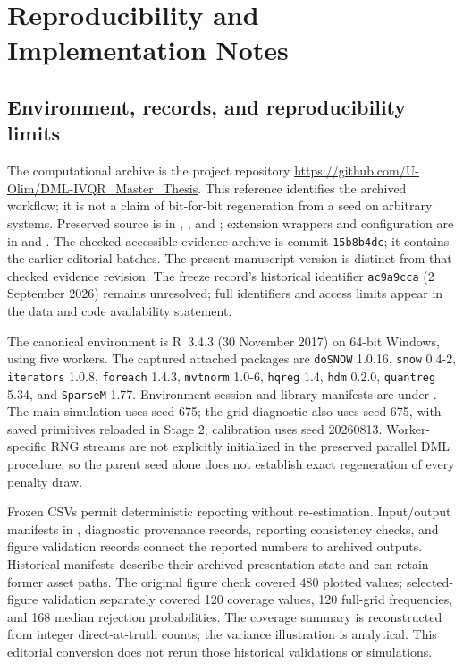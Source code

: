 \clearpage
\section{Reproducibility and Implementation Notes}
\label{app:reproducibility}
\setcounter{equation}{0}\setcounter{table}{0}\setcounter{figure}{0}
\subsection{Environment, records, and reproducibility limits}
The computational archive is the project repository \url{https://github.com/U-Olim/DML-IVQR_Master_Thesis}. This reference identifies the archived workflow; it is not a claim of bit-for-bit regeneration from a seed on arbitrary systems. Preserved source is in , , and ; extension wrappers and configuration are in  and . The checked accessible evidence archive is commit \texttt{15b8b4dc}; it contains the earlier editorial batches. The present manuscript version is distinct from that checked evidence revision. The freeze record's historical identifier \texttt{ac9a9cca} (2 September 2026) remains unresolved; full identifiers and access limits appear in the data and code availability statement.

The canonical environment is R~3.4.3 (30 November 2017) on 64-bit Windows, using five workers. The captured attached packages are \texttt{doSNOW} 1.0.16, \texttt{snow} 0.4-2, \texttt{iterators} 1.0.8, \texttt{foreach} 1.4.3, \texttt{mvtnorm} 1.0-6, \texttt{hqreg} 1.4, \texttt{hdm} 0.2.0, \texttt{quantreg} 5.34, and \texttt{SparseM} 1.77. Environment session and library manifests are under . The main simulation uses seed 675; the grid diagnostic also uses seed 675, with saved primitives reloaded in Stage 2; calibration uses seed 20260813. Worker-specific RNG streams are not explicitly initialized in the preserved parallel DML procedure, so the parent seed alone does not establish exact regeneration of every penalty draw.

Frozen CSVs permit deterministic reporting without re-estimation. Input/output manifests in , diagnostic provenance records, reporting consistency checks, and figure validation records connect the reported numbers to archived outputs. Historical manifests describe their archived presentation state and can retain former asset paths. The original figure check covered 480 plotted values; selected-figure validation separately covered 120 coverage values, 120 full-grid frequencies, and 168 median rejection probabilities. The coverage summary is reconstructed from integer direct-at-truth counts; the variance illustration is analytical. This editorial conversion does not rerun those historical validations or simulations.

